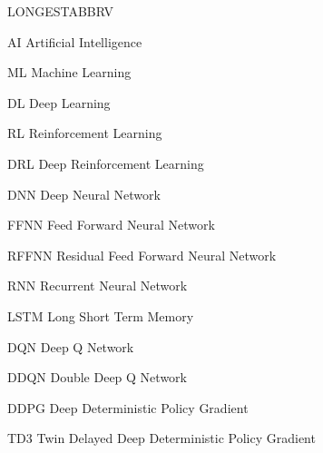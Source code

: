 \begin{theglossary}{LONGESTABBRV}
\item[AI] Artificial Intelligence
\item[ML] Machine Learning
\item[DL] Deep Learning
\item[RL] Reinforcement Learning
\item[DRL] Deep Reinforcement Learning
\item[DNN] Deep Neural Network
\item[FFNN] Feed Forward Neural Network
\item[RFFNN] Residual Feed Forward Neural Network
\item[RNN] Recurrent Neural Network
\item[LSTM] Long Short Term Memory
\item[DQN] Deep Q Network
\item[DDQN] Double Deep Q Network
\item[DDPG] Deep Deterministic Policy Gradient
\item[TD3] Twin Delayed Deep Deterministic Policy Gradient
\end{theglossary}
